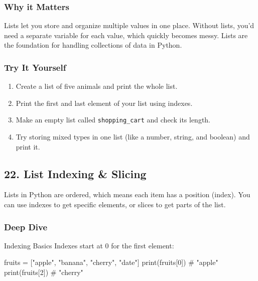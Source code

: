 \documentclass[
  letterpaper,
  DIV=11,
  numbers=noendperiod]{scrreprt}
\newenvironment{Shaded}{\begin{snugshade}}{\end{snugshade}}
\newcommand{\BuiltInTok}[1]{\textcolor[rgb]{0.00,0.23,0.31}{#1}}
\newcommand{\CommentTok}[1]{\textcolor[rgb]{0.37,0.37,0.37}{#1}}
\newcommand{\DecValTok}[1]{\textcolor[rgb]{0.68,0.00,0.00}{#1}}
\newcommand{\NormalTok}[1]{\textcolor[rgb]{0.00,0.23,0.31}{#1}}
\newcommand{\OperatorTok}[1]{\textcolor[rgb]{0.37,0.37,0.37}{#1}}
\newcommand{\StringTok}[1]{\textcolor[rgb]{0.13,0.47,0.30}{#1}}
\providecommand{\tightlist}{%
  \setlength{\itemsep}{0pt}\setlength{\parskip}{0pt}}
\begin{document}
\subsubsection{Why it Matters}\label{why-it-matters-21}

Lists let you store and organize multiple values in one place. Without
lists, you'd need a separate variable for each value, which quickly
becomes messy. Lists are the foundation for handling collections of data
in Python.

\subsubsection{Try It Yourself}\label{try-it-yourself-21}

\begin{enumerate}
\def\labelenumi{\arabic{enumi}.}
\tightlist
\item
  Create a list of five animals and print the whole list.
\item
  Print the first and last element of your list using indexes.
\item
  Make an empty list called \texttt{shopping\_cart} and check its
  length.
\item
  Try storing mixed types in one list (like a number, string, and
  boolean) and print it.
\end{enumerate}

\subsection{22. List Indexing \& Slicing}\label{list-indexing-slicing}

Lists in Python are ordered, which means each item has a position
(index). You can use indexes to get specific elements, or slices to get
parts of the list.

\subsubsection{Deep Dive}\label{deep-dive-22}

Indexing Basics Indexes start at 0 for the first element:

\begin{Shaded}
\begin{Highlighting}[]
\NormalTok{fruits }\OperatorTok{=}\NormalTok{ [}\StringTok{"apple"}\NormalTok{, }\StringTok{"banana"}\NormalTok{, }\StringTok{"cherry"}\NormalTok{, }\StringTok{"date"}\NormalTok{]}
\BuiltInTok{print}\NormalTok{(fruits[}\DecValTok{0}\NormalTok{])   }\CommentTok{\# "apple"}
\BuiltInTok{print}\NormalTok{(fruits[}\DecValTok{2}\NormalTok{])   }\CommentTok{\# "cherry"}
\end{Highlighting}
\end{Shaded}
\end{document}
